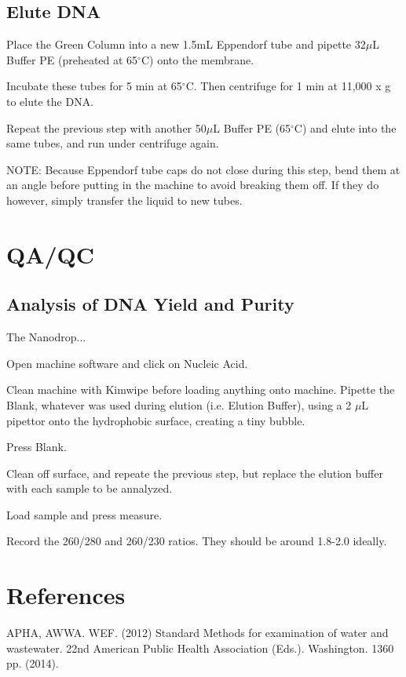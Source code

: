 \documentclass[12pt]{../SOP3_alpha}
\begin{document}
\subsection*{Elute DNA}

\NP Place the Green Column into a new 1.5mL Eppendorf tube and pipette 32$\mu$L Buffer PE (preheated at 65$^\circ$C) onto the membrane. 

\NP Incubate these tubes for 5 min at 65$^\circ$C. Then centrifuge for 1 min at 11,000 x g to elute the DNA.

\NP Repeat the previous step with another 50$\mu$L Buffer PE (65$^\circ$C) and elute into the same tubes, and run under centrifuge again.

\NP NOTE: Because Eppendorf tube caps do not close during this step, bend them at an angle before putting in the machine to avoid breaking them off. If they do however, simply transfer the liquid to new tubes.


\section{QA/QC}

\subsection*{Analysis of DNA Yield and Purity}

\NP The Nanodrop...

\NP Open machine software and click on Nucleic Acid.

\NP Clean machine with Kimwipe before loading anything onto machine. 
\NP Pipette the Blank, whatever was used during elution (i.e. Elution Buffer), using a 2 $\mu$L pipettor onto the hydrophobic surface, creating a tiny bubble.

\NP Press Blank.

\NP Clean off surface, and repeate the previous step, but replace the elution buffer with each sample to be annalyzed.

\NP Load sample and press measure.

\NP Record the 260/280 and 260/230 ratios. They should be around 1.8-2.0 ideally. 

\section{References}

\NP APHA, AWWA. WEF. (2012) Standard Methods for examination of water and wastewater. 22nd American Public Health Association (Eds.). Washington. 1360 pp. (2014).
\end{document}
